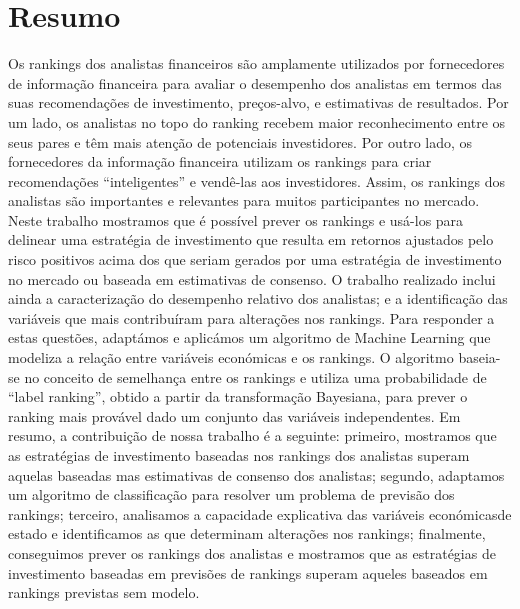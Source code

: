 \chapter*{Resumo}
Os rankings dos analistas financeiros são amplamente utilizados por fornecedores de informação financeira para avaliar o desempenho dos analistas em termos das suas recomendações de investimento, preços-alvo, e estimativas de resultados. Por um lado, os analistas no topo do ranking recebem maior reconhecimento entre os seus pares e têm mais atenção de potenciais investidores. Por outro lado, os fornecedores da informação financeira utilizam os rankings para criar recomendações ``inteligentes'' e vendê-las aos investidores. Assim, os rankings dos analistas são importantes e relevantes para muitos participantes no mercado. Neste trabalho mostramos que é possível prever os rankings  e usá-los para delinear uma estratégia de investimento que resulta em retornos ajustados pelo risco positivos acima dos que seriam gerados por uma estratégia de investimento no mercado ou baseada em estimativas de consenso. O trabalho realizado inclui ainda a  caracterização do desempenho relativo dos analistas; e a identificação das variáveis ​​que mais contribuíram para alterações  nos rankings. Para responder a estas questões, adaptámos e aplicámos um algoritmo de  Machine Learning que modeliza a relação entre variáveis económicas ​​e os rankings. O algoritmo baseia-se no conceito de semelhança entre os rankings e utiliza uma probabilidade de ``label ranking'', obtido a partir da transformação Bayesiana, para prever o ranking mais provável dado um conjunto das variáveis ​​independentes. Em resumo, a contribuição de nossa trabalho é a seguinte: primeiro, mostramos que as estratégias de investimento baseadas nos rankings dos analistas superam aquelas baseadas mas estimativas de consenso dos analistas; segundo, adaptamos um algoritmo de classificação para resolver um problema de previsão dos rankings; terceiro, analisamos a capacidade explicativa das variáveis económicas ​​de estado e identificamos as que determinam alterações nos rankings; finalmente, conseguimos prever os rankings dos analistas  e mostramos que as estratégias de investimento baseadas em previsões de rankings superam aqueles baseados em rankings previstas sem modelo.
